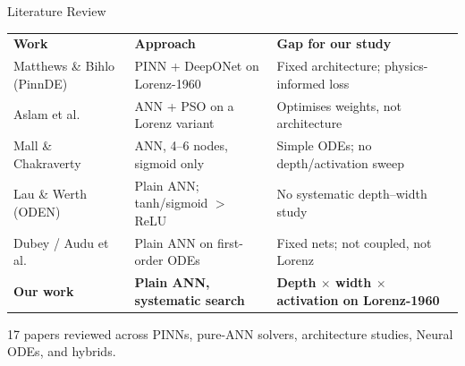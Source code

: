 \documentclass[aspectratio=169,11pt]{beamer}
\begin{document}
\begin{frame}{Literature Review}
  \centering\footnotesize
  \renewcommand{\arraystretch}{1.25}
  \begin{tabular}{>{\raggedright\arraybackslash}p{3.0cm} >{\raggedright\arraybackslash}p{4.0cm} >{\raggedright\arraybackslash}p{4.6cm}}
    \rowcolor{tealDark}
    \textbf{\color{white}Work} & \textbf{\color{white}Approach} & \textbf{\color{white}Gap for our study}\\
    \rowcolor{tealSoft}
    Matthews \& Bihlo (PinnDE) & PINN + DeepONet on Lorenz-1960 & Fixed architecture; physics-informed loss\\
    Aslam et al. & ANN + PSO on a Lorenz variant & Optimises weights, not architecture\\
    \rowcolor{tealSoft}
    Mall \& Chakraverty & ANN, 4--6 nodes, sigmoid only & Simple ODEs; no depth/activation sweep\\
    Lau \& Werth (ODEN) & Plain ANN; tanh/sigmoid $>$ ReLU & No systematic depth--width study\\
    \rowcolor{tealSoft}
    Dubey / Audu et al. & Plain ANN on first-order ODEs & Fixed nets; not coupled, not Lorenz\\
    \textbf{Our work} & \textbf{Plain ANN, systematic search} & \textbf{Depth $\times$ width $\times$ activation on Lorenz-1960}\\
  \end{tabular}
  \vspace{0.25cm}
  \begin{plaincard}
    \centering\scriptsize 17 papers reviewed across PINNs, pure-ANN solvers, architecture studies, Neural ODEs, and hybrids.
  \end{plaincard}
\end{frame}
\end{document}
